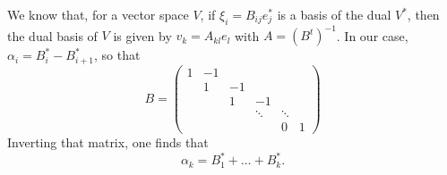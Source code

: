 We know that, for a vector space $V$, if $\xi_i=B_{ij} e^*_j$ is a basis of the dual $V^*$, then the dual basis of $V$ is given by $v_k=A_{kl}e_l$ with $A=(B^t)^{-1}$. In our case, $\alpha_i=B_i^*-B_{i+1}^*$, so that
\begin{equation}
	B =
	\begin{pmatrix}
		1	&	-1\\
		&	1	&	-1\\
		&	&	1	&	-1\\
		&	&	&	\ddots	&\ddots\\
		&	&	&		& 0&1
	\end{pmatrix}
\end{equation}
Inverting that matrix, one finds that
\begin{equation}
	\alpha_k = B_1^*+\ldots+B_k^*.
\end{equation}

